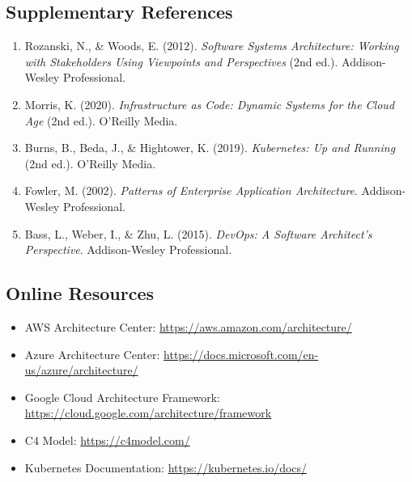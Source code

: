 \documentclass[11pt,letterpaper]{article}
\begin{document}
\subsection{Supplementary References}

\begin{enumerate}[resume]
    \item Rozanski, N., \& Woods, E. (2012). \textit{Software Systems Architecture: Working with Stakeholders Using Viewpoints and Perspectives} (2nd ed.). Addison-Wesley Professional.
    
    \item Morris, K. (2020). \textit{Infrastructure as Code: Dynamic Systems for the Cloud Age} (2nd ed.). O'Reilly Media.
    
    \item Burns, B., Beda, J., \& Hightower, K. (2019). \textit{Kubernetes: Up and Running} (2nd ed.). O'Reilly Media.
    
    \item Fowler, M. (2002). \textit{Patterns of Enterprise Application Architecture}. Addison-Wesley Professional.
    
    \item Bass, L., Weber, I., \& Zhu, L. (2015). \textit{DevOps: A Software Architect's Perspective}. Addison-Wesley Professional.
\end{enumerate}

\subsection{Online Resources}

\begin{itemize}
    \item AWS Architecture Center: \url{https://aws.amazon.com/architecture/}
    \item Azure Architecture Center: \url{https://docs.microsoft.com/en-us/azure/architecture/}
    \item Google Cloud Architecture Framework: \url{https://cloud.google.com/architecture/framework}
    \item C4 Model: \url{https://c4model.com/}
    \item Kubernetes Documentation: \url{https://kubernetes.io/docs/}
\end{itemize}

\appendix
\end{document}

